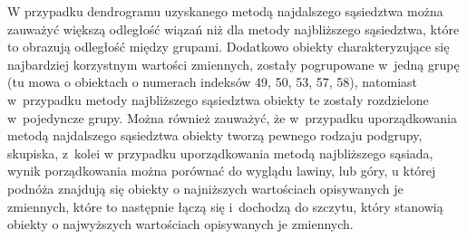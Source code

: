 \documentclass[12pt,a4paper]{report}
\begin{document}
{W przypadku dendrogramu uzyskanego metodą najdalszego sąsiedztwa można
zauważyć większą odległość wiązań niż dla metody najbliższego
sąsiedztwa, które to obrazują odległość między grupami. Dodatkowo
obiekty charakteryzujące się najbardziej korzystnym wartości zmiennych,
zostały pogrupowane w~jedną grupę (tu mowa o obiektach o numerach
indeksów 49, 50, 53, 57, 58), natomiast w~przypadku metody najbliższego
sąsiedztwa obiekty te zostały rozdzielone w~pojedyncze grupy. Można
również zauważyć, że w~przypadku uporządkowania metodą najdalszego
sąsiedztwa obiekty tworzą pewnego rodzaju podgrupy, skupiska, z~kolei w
przypadku uporządkowania metodą najbliższego sąsiada, wynik
porządkowania można porównać do wyglądu lawiny, lub góry, u której
podnóża znajdują się obiekty o najniższych wartościach opisywanych je
zmiennych, które to następnie łączą się i~dochodzą do szczytu, który stanowią
obiekty o najwyższych wartościach opisywanych je zmiennych.

}
\end{document}
